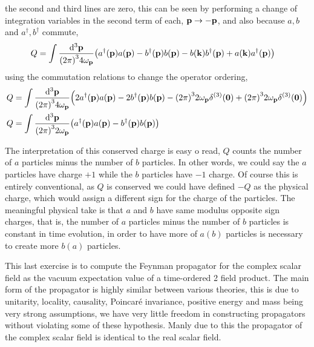 the second and third lines are zero, this can be seen by performing a change of integration variables in the second term of each, $\vb p\rightarrow -\vb p$, and also because $a,b$ and $a^\dagger,b^\dagger$ commute,
\begin{align}
    Q&=\int\frac{\dd[3]{\vb p}}{\qty(2\pi)^34\omega_{\vb p}}\qty(a^\dagger\qty(\vb p)a\qty(\vb p)-b^\dagger\qty(\vb p)b\qty(\vb p)-b\qty(\vb k)b^\dagger\qty(\vb p)+a\qty(\vb k)a^\dagger\qty(\vb p))
\end{align}
using the commutation relations to change the operator ordering,
\begin{align}
    Q&=\int\frac{\dd[3]{\vb p}}{\qty(2\pi)^34\omega_{\vb p}}\qty(2a^\dagger\qty(\vb p)a\qty(\vb p)-2b^\dagger\qty(\vb p)b\qty(\vb p)-\qty(2\pi)^32\omega_{\vb p}\delta^{\qty(3)}\qty(\vb 0)+\qty(2\pi)^32\omega_{\vb p}\delta^{\qty(3)}\qty(\vb 0))\\
    Q&=\int\frac{\dd[3]{\vb p}}{\qty(2\pi)^32\omega_{\vb p}}\qty(a^\dagger\qty(\vb p)a\qty(\vb p)-b^\dagger\qty(\vb p)b\qty(\vb p))
\end{align}

The interpretation of this conserved charge is easy o read, $Q$ counts the number of $a$ particles minus the number of $b$ particles. In other words, we could say the $a$ particles have charge $+1$ while the $b$ particles 
have $-1$ charge. Of course this is entirely conventional, as $Q$ is conserved we could have defined $-Q$ as the physical charge, which would assign a different sign for the charge of the particles. The meaningful 
physical take is that $a$ and $b$ have same modulus opposite sign charges, that is, the number of $a$ particles minus the number of $b$ particles is constant in time evolution, in order to have more 
of $a(b)$ particles is necessary to create more $b(a)$ particles. 

\probitem{}

This last exercise is to compute the Feynman propagator for the complex scalar field as the vacuum expectation value of a time-ordered 2 field product. The main form of the propagator is 
highly similar between various theories, this is due to unitarity, locality, causality, Poincaré invariance, positive energy and mass being very strong assumptions, we have very little freedom 
in constructing propagators without violating some of these hypothesis. Manly due to this the propagator of the complex scalar field is identical to the real scalar field.


